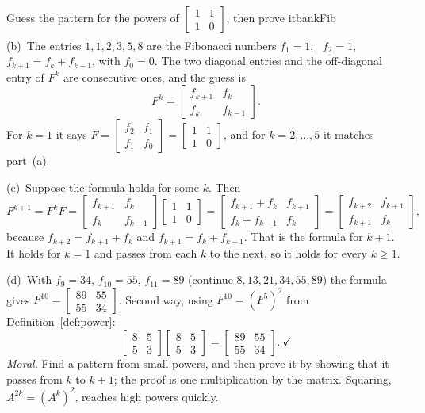 \documentclass[11pt]{article}
\begin{document}
\begin{exmp}{Guess the pattern for the powers of $\begin{bmatrix}1&1\\1&0\end{bmatrix}$, then prove it}{bankFib}
\begin{align*}
\end{align*}
(b)~The entries $1,1,2,3,5,8$ are the Fibonacci numbers $f_1=1$, \ $f_2=1$, \ $f_{k+1}=f_k+f_{k-1}$, with $f_0=0$. The two diagonal entries and the off-diagonal entry of $F^k$ are consecutive ones, and the guess is
\[
F^k=\begin{bmatrix}f_{k+1}&f_k\\f_k&f_{k-1}\end{bmatrix}.
\]
For $k=1$ it says $F=\begin{bmatrix}f_2&f_1\\f_1&f_0\end{bmatrix}=\begin{bmatrix}1&1\\1&0\end{bmatrix}$, and for $k=2,\dots,5$ it matches part~(a).

(c)~Suppose the formula holds for some $k$. Then
\[
F^{k+1}=F^kF=\begin{bmatrix}f_{k+1}&f_k\\f_k&f_{k-1}\end{bmatrix}\begin{bmatrix}1&1\\1&0\end{bmatrix}=\begin{bmatrix}f_{k+1}+f_k&f_{k+1}\\f_k+f_{k-1}&f_k\end{bmatrix}=\begin{bmatrix}f_{k+2}&f_{k+1}\\f_{k+1}&f_k\end{bmatrix},
\]
because $f_{k+2}=f_{k+1}+f_k$ and $f_{k+1}=f_k+f_{k-1}$. That is the formula for $k+1$. It holds for $k=1$ and passes from each $k$ to the next, so it holds for every $k\ge1$.

(d)~With $f_9=34$, $f_{10}=55$, $f_{11}=89$ (continue $8,13,21,34,55,89$) the formula gives $F^{10}=\begin{bmatrix}89&55\\55&34\end{bmatrix}$. Second way, using $F^{10}=(F^5)^2$ from Definition~\ref{def:power}:
\[
\begin{bmatrix}8&5\\5&3\end{bmatrix}\begin{bmatrix}8&5\\5&3\end{bmatrix}=\begin{bmatrix}89&55\\55&34\end{bmatrix}.\ \checkmark
\]
\emph{Moral.} Find a pattern from small powers, and then prove it by showing that it passes from $k$ to $k+1$; the proof is one multiplication by the matrix. Squaring, $A^{2k}=(A^k)^2$, reaches high powers quickly.
\end{exmp}
\end{document}
